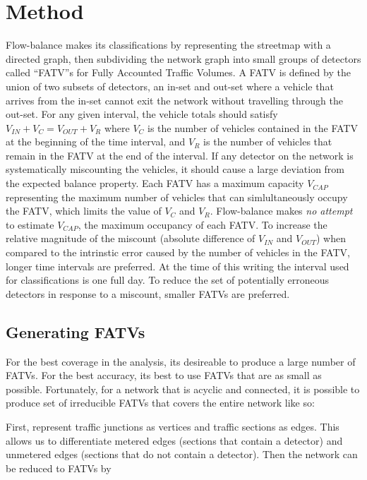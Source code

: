 \documentclass[titlepage]{article}
\begin{document}
\section{Method}\label{method}
Flow-balance makes its classifications by representing the streetmap with a directed graph, then subdividing the network graph into small groups of detectors called ``FATV''s for Fully Accounted Traffic Volumes. A FATV is defined by the union of two subsets of detectors, an in-set and out-set where a vehicle that arrives from the in-set cannot exit the network without travelling through the out-set. For any given interval, the vehicle totals should satisfy $V_{IN} + V_C = V_{OUT} + V_R$ where $V_C$ is the number of vehicles contained in the FATV at the beginning of the time interval, and $V_R$ is the number of vehicles that remain in the FATV at the end of the interval. If any detector on the network is systematically miscounting the vehicles, it should cause a large deviation from the expected balance property. Each FATV has a maximum capacity $V_{CAP}$ representing the maximum number of vehicles that can simlultaneously occupy the FATV, which limits the value of $V_C$ and $V_R$. Flow-balance makes \textit{no attempt} to estimate $V_{CAP}$, the maximum occupancy of each FATV. To increase the relative magnitude of the miscount (absolute difference of $V_{IN}$ and $V_{OUT}$) when compared to the intrinstic error caused by the number of vehicles in the FATV, longer time intervals are preferred. At the time of this writing the interval used for classifications is one full day. To reduce the set of potentially erroneous detectors in response to a miscount, smaller FATVs are preferred.

\subsection{Generating FATVs}\label{fatvs}
For the best coverage in the analysis, its desireable to produce a large number of FATVs. For the best accuracy, its best to use FATVs that are as small as possible. Fortunately, for a network that is acyclic and connected, it is possible to produce set of irreducible FATVs that covers the entire network like so:

First, represent traffic junctions as vertices and traffic sections as edges. This allows us to differentiate metered edges (sections that contain a detector) and unmetered edges (sections that do not contain a detector). Then the network can be reduced to FATVs by
\end{document}
